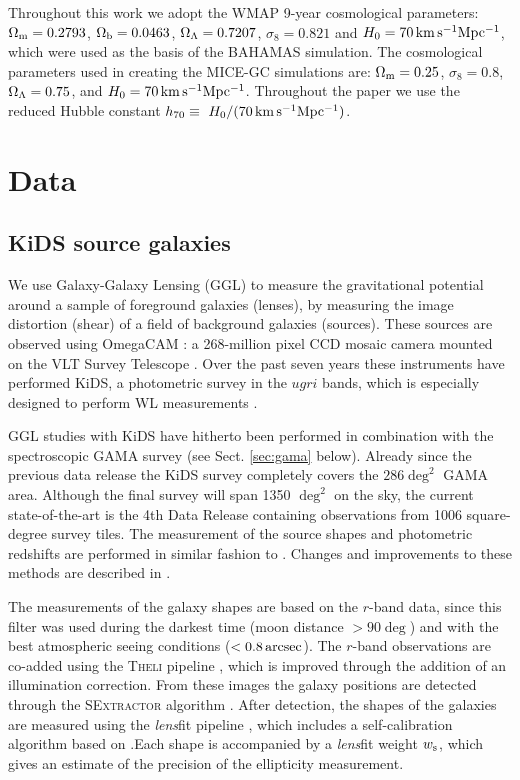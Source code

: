 \documentclass[usenatbib]{mnras}
\newcommand{\as}{\, {\rm arcsec}}
\newcommand{\un}[1]{_{\rm #1}}
\begin{document}
Throughout this work we adopt the WMAP 9-year \cite[]{hinshaw2013} cosmological parameters: $\Omega\un{m}=0.2793$, $\Omega\un{b}=0.0463$, $\Omega\un{\Lambda}=0.7207$, $\sigma_8=0.821$ and $H_0 = 70 \, {\rm km \, s^{-1} Mpc^{-1}}$, which were used as the basis of the BAHAMAS simulation. The cosmological parameters used in creating the MICE-GC simulations are: $\Omega_{\rm m}=0.25$, $\sigma_8=0.8$, $\Omega_{\rm \Lambda}=0.75$, and $H_0 = 70 \, {\rm km \, s^{-1} Mpc^{-1}}$. Throughout the paper we use the reduced Hubble constant $h_{70} \equiv \ H_0 / (70 \, {\rm km \, s^{-1} Mpc^{-1}})$.

\section{Data}
\label{sec:data}

\subsection{KiDS source galaxies}
\label{sec:kids}

We use Galaxy-Galaxy Lensing (GGL) to measure the gravitational potential around a sample of foreground galaxies (lenses), by measuring the image distortion (shear) of a field of background galaxies (sources). These sources are observed using OmegaCAM \cite[]{kuijken2011}: a 268-million pixel CCD mosaic
camera mounted on the VLT Survey Telescope \cite[]{capaccioli2011}. Over the past seven years these instruments have performed KiDS, a photometric survey in the $ugri$ bands, which is especially designed to perform WL measurements \cite[]{dejong2013}.

GGL studies with KiDS have hitherto been performed in combination with the spectroscopic GAMA survey (see Sect. \ref{sec:gama} below). Already since the previous data release \cite[KiDS-DR3,][]{dejong2017} the KiDS survey completely covers the $286 \deg^2$ GAMA area. Although the final survey will span 1350 $\deg^2$ on the sky, the current state-of-the-art is the 4th Data Release \cite[KiDS-DR4,][]{kuijken2019} containing observations from 1006 square-degree survey tiles. The measurement of the source shapes and photometric redshifts are performed in similar fashion to \cite{dejong2017}. Changes and improvements to these methods are described in \cite{kuijken2019}. 

The measurements of the galaxy shapes are based on the $r$-band data, since this filter was used during the darkest time (moon distance $> 90 \deg$) and with the best atmospheric seeing conditions ($<0.8 \as$). The $r$-band observations are co-added using the {\scshape Theli} pipeline \cite[]{erben2013}, which is improved through the addition of an illumination correction. From these images the galaxy positions are detected through the {\scshape SExtractor} algorithm \cite[]{bertin1996}. After detection, the shapes of the galaxies are measured using the \emph{lens}fit pipeline \cite[]{miller2007,miller2013}, which includes a self-calibration algorithm based on \cite{fenechconti2017}.Each shape is accompanied by a \emph{lens}fit weight $w\un{s}$, which gives an estimate of the precision of the ellipticity measurement.
\end{document}
